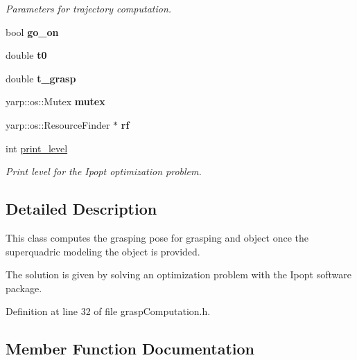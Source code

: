 \begin{DoxyCompactItemize}
\begin{DoxyCompactList}\small\item\em Parameters for trajectory computation. \end{DoxyCompactList}\item 
bool {\bfseries go\+\_\+on}\label{classGraspComputation_a309d4de6f3b04be27ab83e4b32213431}

\item 
double {\bfseries t0}\label{classGraspComputation_a5abf6bd76a8b1a5aee7a49b8ef16a6ac}

\item 
double {\bfseries t\+\_\+grasp}\label{classGraspComputation_a5f5784795d8897981205e4f8e56fe94b}

\item 
yarp\+::os\+::\+Mutex {\bfseries mutex}\label{classGraspComputation_a90ceee41cc255a3e818728228910fec8}

\item 
yarp\+::os\+::\+Resource\+Finder $\ast$ {\bfseries rf}\label{classGraspComputation_a0e0cb4d1a5c490b3da70c2221cb4dd5a}

\item 
int \hyperlink{classGraspComputation_ae79cf636d04cc911176e25edc86b5609}{print\+\_\+level}\label{classGraspComputation_ae79cf636d04cc911176e25edc86b5609}

\begin{DoxyCompactList}\small\item\em Print level for the Ipopt optimization problem. \end{DoxyCompactList}\end{DoxyCompactItemize}


\subsection{Detailed Description}
This class computes the grasping pose for grasping and object once the superquadric modeling the object is provided. 

The solution is given by solving an optimization problem with the Ipopt software package. 

Definition at line 32 of file grasp\+Computation.\+h.



\subsection{Member Function Documentation}
